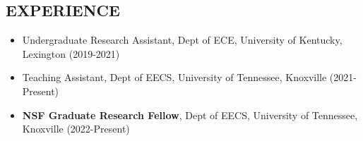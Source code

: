 \documentclass[line,margin,9pt]{res}
\begin{document}
\begin{resume}










\section{EXPERIENCE}
\begin{itemize}
\item Undergraduate Research Assistant, Dept of ECE, University of Kentucky, Lexington (2019-2021)
\item Teaching Assistant, Dept of EECS, University of Tennessee, Knoxville (2021-Present)
\item \textbf{NSF Graduate Research Fellow}, Dept of EECS, University of Tennessee, Knoxville (2022-Present)


\end{itemize}
\end{resume}
\end{document}
